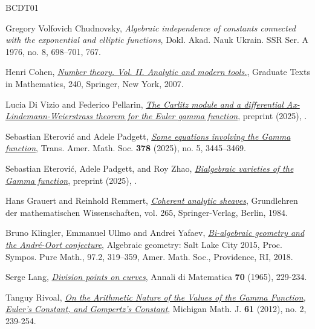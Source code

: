 \documentclass[11pt,reqno]{amsart}
\theoremstyle{definition}
\numberwithin{equation}{section}
\begin{document}
\begin{thebibliography}{BCDT01}
\setlength{\itemsep}{0.5ex}



Gregory Volfovich Chudnovsky, {\emph{Algebraic independence of constants connected with the exponential and elliptic functions}}, Dokl. Akad. Nauk Ukrain. SSR Ser. A 1976, no. 8, 698–701, 767.

Henri Cohen, \href{https://link.springer.com/book/10.1007/978-0-387-49894-2}{\emph{Number theory. Vol. II. Analytic and modern tools.}}, Graduate Texts in Mathematics, 240, Springer, New York, 2007. 

Lucia Di Vizio and Federico Pellarin,  \href{https://arxiv.org/abs/2508.21237}{\emph{The Carlitz module and a differential Ax-Lindemann-Weierstrass theorem for the Euler gamma function}}, preprint (2025), . 




Sebastian Eterovi\'c and Adele Padgett, \href{https://pubs.ams.org/journals/tran/2025-378-05/S0002-9947-2025-09361-9}{\emph{Some equations involving the Gamma function}}, 
Trans.
Amer. Math. Soc. \textbf{378} (2025), no. 5, 3445–3469.




Sebastian Eterovi\'c, Adele Padgett, and Roy Zhao,   \href{https://arxiv.org/pdf/2509.24982}{\emph{Bialgebraic varieties of the Gamma function}}, preprint (2025), .  


Hans Grauert and Reinhold Remmert, \href{https://link.springer.com/book/10.1007/978-3-642-69582-7}{\emph{Coherent analytic sheaves}}, Grundlehren der mathematischen Wissenschaften, vol. 265, Springer-Verlag, Berlin, 1984.  

Bruno {Klingler}, Emmanuel {Ullmo} and Andrei {Yafaev},
 {\href{https://www2.mathematik.hu-berlin.de/~klingleb/papiers/Survey2.pdf}{\emph{{Bi-algebraic geometry and the Andr\'e-Oort conjecture}}}}, Algebraic geometry: {S}alt {L}ake {C}ity 2015, Proc. Sympos. Pure Math., 97.2, 319--359, Amer. Math. Soc., Providence, RI, 2018. 


Serge Lang, \href{https://link.springer.com/article/10.1007/BF02410091}{\emph{Division points on curves}},  Annali di Matematica  \textbf{70} (1965), 229-234. 

 Tanguy Rivoal, \href{https://doi.org/10.1307/mmj/1339011525}{ \emph{On the Arithmetic Nature of the Values of the
Gamma Function, Euler’s Constant,
and Gompertz’s Constant}}, Michigan Math. J. \textbf{61} (2012), no. 2,  239-254. 


\end{thebibliography}
\end{document}
